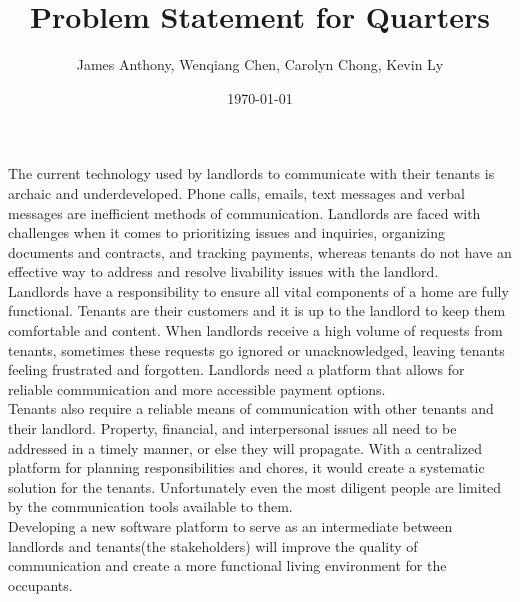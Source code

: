 \documentclass[12pt]{article}
\begin{document}
\title{Problem Statement for Quarters} 
\author{James Anthony, Wenqiang Chen, Carolyn Chong, Kevin Ly}
\date{\today}
	
\maketitle

The current technology used by landlords to communicate with their tenants is 
archaic and underdeveloped. Phone calls, emails, text messages and verbal 
messages are inefficient methods of communication. Landlords are faced with 
challenges when it comes to prioritizing issues and inquiries, organizing 
documents and contracts, and tracking payments, whereas tenants do not have an 
effective way to address and resolve livability issues with the landlord. \\

Landlords have a responsibility to ensure all vital components of a home are 
fully functional. Tenants are their customers and it is up to the landlord to 
keep them comfortable and content. When landlords receive a high volume of 
requests from tenants, sometimes these requests go ignored or unacknowledged, 
leaving tenants feeling frustrated and forgotten.
Landlords need a platform that allows for reliable communication and more 
accessible payment options. \\

Tenants also require a reliable means of communication with other tenants and their 
landlord. Property, financial, and interpersonal issues all need to be addressed 
in a timely manner, or else they will propagate. With a centralized 
platform for planning responsibilities and chores, it would create a systematic 
solution for the tenants. Unfortunately even the most diligent people are limited 
by the communication tools available to them. \\

Developing a new software platform to serve as an intermediate between 
landlords and tenants(the stakeholders) will improve the quality of communication 
and create a more functional living environment for the occupants.
\end{document}
